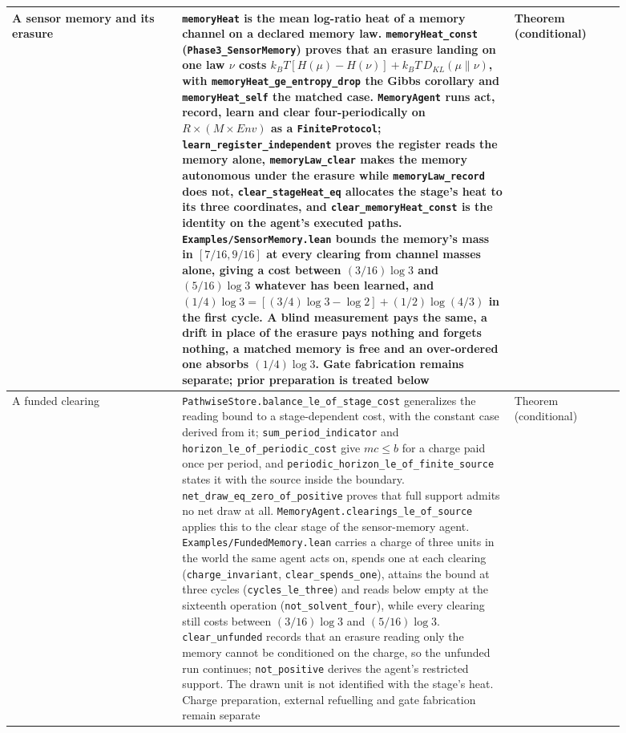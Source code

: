 \documentclass{article}
\begin{document}
\begin{longtable}{|>{\raggedright\arraybackslash}p{0.26\linewidth}|>{\raggedright\arraybackslash}p{0.46\linewidth}|>{\raggedright\arraybackslash}p{0.17\linewidth}|}
A sensor memory and its erasure & \texttt{memoryHeat} is the mean log-ratio heat of a memory channel on a declared memory law. \nolinkurl{memoryHeat_const} (\nolinkurl{Phase3_SensorMemory}) proves that an erasure landing on one law $\nu$ costs $k_BT[H(\mu)-H(\nu)]+k_BT\,D_{KL}(\mu\|\nu)$, with \nolinkurl{memoryHeat_ge_entropy_drop} the Gibbs corollary and \nolinkurl{memoryHeat_self} the matched case. \texttt{MemoryAgent} runs act, record, learn and clear four-periodically on $R\times(M\times\mathit{Env})$ as a \texttt{FiniteProtocol}; \nolinkurl{learn_register_independent} proves the register reads the memory alone, \nolinkurl{memoryLaw_clear} makes the memory autonomous under the erasure while \nolinkurl{memoryLaw_record} does not, \nolinkurl{clear_stageHeat_eq} allocates the stage's heat to its three coordinates, and \nolinkurl{clear_memoryHeat_const} is the identity on the agent's executed paths. \texttt{Examples/SensorMemory.lean} bounds the memory's mass in $[7/16,9/16]$ at every clearing from channel masses alone, giving a cost between $(3/16)\log3$ and $(5/16)\log3$ whatever has been learned, and $(1/4)\log3=[(3/4)\log3-\log2]+(1/2)\log(4/3)$ in the first cycle. A blind measurement pays the same, a drift in place of the erasure pays nothing and forgets nothing, a matched memory is free and an over-ordered one absorbs $(1/4)\log3$. Gate fabrication remains separate; prior preparation is treated below & Theorem (conditional) \\ \hline
A funded clearing & \nolinkurl{PathwiseStore.balance_le_of_stage_cost} generalizes the reading bound to a stage-dependent cost, with the constant case derived from it; \nolinkurl{sum_period_indicator} and \nolinkurl{horizon_le_of_periodic_cost} give $mc\leq b$ for a charge paid once per period, and \nolinkurl{periodic_horizon_le_of_finite_source} states it with the source inside the boundary. \nolinkurl{net_draw_eq_zero_of_positive} proves that full support admits no net draw at all. \nolinkurl{MemoryAgent.clearings_le_of_source} applies this to the clear stage of the sensor-memory agent. \texttt{Examples/FundedMemory.lean} carries a charge of three units in the world the same agent acts on, spends one at each clearing (\nolinkurl{charge_invariant}, \nolinkurl{clear_spends_one}), attains the bound at three cycles (\nolinkurl{cycles_le_three}) and reads below empty at the sixteenth operation (\nolinkurl{not_solvent_four}), while every clearing still costs between $(3/16)\log3$ and $(5/16)\log3$. \nolinkurl{clear_unfunded} records that an erasure reading only the memory cannot be conditioned on the charge, so the unfunded run continues; \nolinkurl{not_positive} derives the agent's restricted support. The drawn unit is not identified with the stage's heat. Charge preparation, external refuelling and gate fabrication remain separate & Theorem (conditional) \\ \hline

\end{longtable}
\end{document}
